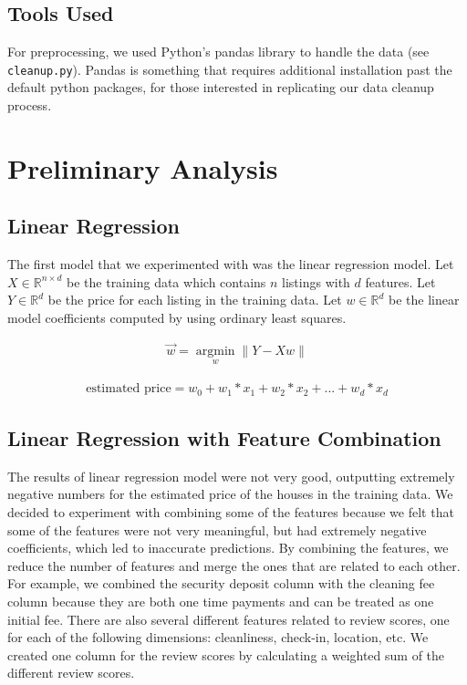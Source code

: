 \documentclass{article}
\begin{document}
\subsection{Tools Used}
For preprocessing, we used Python's pandas library to handle the data (see \texttt{cleanup.py}). Pandas is something that requires additional installation past the default python packages, for those interested in replicating our data cleanup process.

\section{Preliminary Analysis}
\subsection{Linear Regression}
The first model that we experimented with was the linear regression model. Let $X \in \mathds{R}^{n \times d}$ be the training data which contains $n$ listings with $d$ features. Let $Y \in \mathds{R}^d$ be the price for each listing in the training data. Let $w \in \mathds{R}^d$ be the linear model coefficients computed by using ordinary least squares.

\begin{align*}
  \vec{w} = \underset{w}{\operatorname{argmin}}
  \lVert Y-Xw \rVert
\end{align*}

\begin{align*}
	\textrm{estimated price} = w_0 + w_1*x_1 + w_2*x_2 + ... + w_d* x_d
\end{align*}

\subsection{Linear Regression with Feature Combination}
The results of linear regression model were not very good, outputting extremely negative numbers for the estimated price of the houses in the training data. We decided to experiment with combining some of the features because we felt that some of the features were not very meaningful, but had extremely negative coefficients, which led to inaccurate predictions. By combining the features, we reduce the number of features and merge the ones that are related to each other. \\

For example, we combined the security deposit column with the cleaning fee column because they are both one time payments and can be treated as one initial fee. There are also several different features related to review scores, one for each of the following dimensions: cleanliness, check-in, location, etc. We created one column for the review scores by calculating a weighted sum of the different review scores.\\
\end{document}
